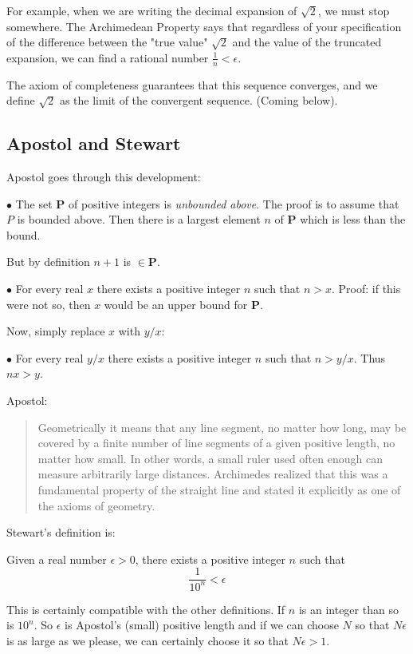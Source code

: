 \documentclass[11pt, oneside]{article}
\begin{document}
For example, when we are writing the decimal expansion of $\sqrt{2}$, we must stop somewhere.  The Archimedean Property says that regardless of your specification of the difference between the "true value" $\sqrt{2}$ and the value of the truncated expansion, we can find a rational number $\frac{1}{n} < \epsilon$.

The axiom of completeness guarantees that this sequence converges, and we define $\sqrt{2}$ as the limit of the convergent sequence.  (Coming below).

\subsection*{Apostol and Stewart}

Apostol goes through this development:

$\bullet$  The set $\mathbf{P}$ of positive integers is \emph{unbounded above}.  The proof is to assume that $P$ is bounded above.  Then there is a largest element $n$ of $\mathbf{P}$ which is less than the bound.  

But by definition $n + 1$ is $\in \mathbf{P}$.

$\bullet$  For every real $x$ there exists a positive integer $n$ such that $n > x$.  Proof:  if this were not so, then $x$ would be an upper bound for $\mathbf{P}$.

Now, simply replace $x$ with $y/x$:

$\bullet$  For every real $y/x$ there exists a positive integer $n$ such that $n > y/x$.  Thus $nx > y$.

Apostol: 

\begin{quote}Geometrically it means that any line segment, no matter how long, may be covered by a finite number of line segments of a given positive length, no matter how small. In other words, a small ruler used often enough can measure arbitrarily large distances. Archimedes realized that this was a fundamental property of the straight line and stated it explicitly as one of the axioms of geometry.\end{quote}

Stewart's definition is:

Given a real number $\epsilon > 0$, there exists a positive integer $n$ such that
\[ \frac{1}{10^n} < \epsilon \]

This is certainly compatible with the other definitions.  If $n$ is an integer than so is $10^n$.  So $\epsilon$ is Apostol's (small) positive length and if we can choose $N$ so that $N \epsilon$ is as large as we please, we can certainly choose it so that $N \epsilon > 1$.
\end{document}
